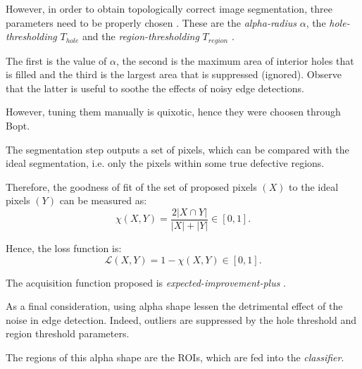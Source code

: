        \par{
            However, in order to obtain topologically correct image segmentation, three parameters need to be properly chosen \cite{springer:10.1007/11907350_46}. These are the \emph{alpha-radius} $\alpha$, the \emph{hole-thresholding} $T_{hole}$ and the \emph{region-thresholding} $T_{region}$ \cite{matlab:alpha-shape}.
        }
        \par{
            The first is the value of $\alpha$, the second is the maximum area of interior holes that is filled and the third is the largest area that is suppressed (ignored). Observe that the latter is useful to soothe the effects of noisy edge detections.
        }
        \par{
            However, tuning them manually is quixotic, hence they were choosen through Bopt.
        }
        \par{
            The segmentation step outputs a set of pixels, which can be compared with the ideal segmentation, i.e. only the pixels within some true defective regions.
        }
        \par{
            Therefore, the goodness of fit of the set of proposed pixels $\left(X\right)$ to the ideal pixels $\left(Y\right)$ can be measured as:
            \begin{equation*}
                \chi\left(X, Y\right) = \frac{2 \lvert X \cap Y \rvert}{\lvert X \rvert + \lvert Y \rvert} \in \left[0,1\right].
            \end{equation*}
        }
        \par{
            Hence, the loss function is:
            \begin{equation*}
                \mathcal{L}\left(X, Y\right) = 1 - \chi\left(X, Y\right) \in \left[0,1\right].
            \end{equation*}
        }
        \par{
            The acquisition function proposed is \emph{expected-improvement-plus} \cite{matlab:acquisition}.
        }
        \par{
            As a final consideration, using alpha shape lessen the detrimental effect of the noise in edge detection. Indeed, outliers are suppressed by the hole threshold and region threshold parameters.
        }
        \par{
            The regions of this alpha shape are the ROIs, which are fed into the \emph{classifier}.
        }
